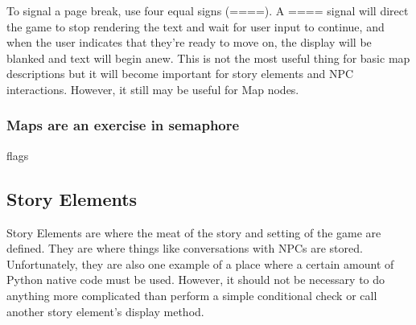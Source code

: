 \documentclass[11pt]{article}
\begin{document}
To signal a page break, use four equal signs (====).
A ==== signal will direct the game to stop rendering the text and wait for user input to continue, and when the user indicates that they're ready to move on, the display will be blanked and text will begin anew.
This is not the most useful thing for basic map descriptions but it will become important for story elements and NPC interactions.
However, it still may be useful for Map nodes.
\subsubsection{Maps are an exercise in semaphore}
flags
\subsection{Story Elements}
Story Elements are where the meat of the story and setting of the game are defined.
They are where things like conversations with NPCs are stored.
Unfortunately, they are also one example of a place where a certain amount of Python native code must be used.
However, it should not be necessary to do anything more complicated than perform a simple conditional check or call another story element's display method.
\end{document}
